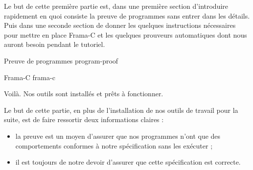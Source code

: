 
Le but de cette première partie est, dans une première section d'introduire
rapidement en quoi consiste la preuve de programmes sans entrer dans les 
détails. Puis dans une seconde section de donner les quelques instructions 
nécessaires pour mettre en place Frama-C et les quelques prouveurs 
automatiques dont nous auront besoin pendant le tutoriel.


\begin{levelTwo}
  {Preuve de programmes}
  {program-proof}
\end{levelTwo}


\begin{levelTwo}
  {Frama-C}
  {frama-c}
\end{levelTwo}


\horizontalLine

\newpage

Voilà. Nos outils sont installés et prêts à fonctionner.



Le but de cette partie, en plus de l'installation de nos outils de travail
pour la suite, est de faire ressortir deux informations claires :



\begin{itemize}
\item la preuve est un moyen d'assurer que nos programmes n'ont que des 
comportements conformes à notre spécification sans les exécuter ;
\item il est toujours de notre devoir d'assurer que cette spécification est
correcte.
\end{itemize}
